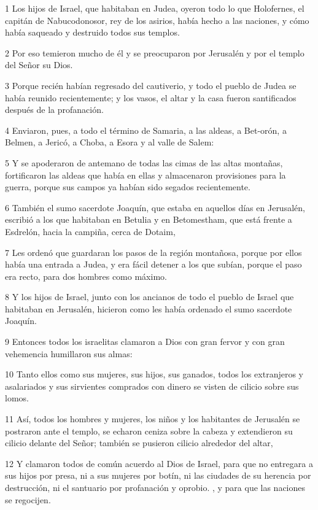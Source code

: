 \par 1 Los hijos de Israel, que habitaban en Judea, oyeron todo lo que Holofernes, el capitán de Nabucodonosor, rey de los asirios, había hecho a las naciones, y cómo había saqueado y destruido todos sus templos.
\par 2 Por eso temieron mucho de él y se preocuparon por Jerusalén y por el templo del Señor su Dios.
\par 3 Porque recién habían regresado del cautiverio, y todo el pueblo de Judea se había reunido recientemente; y los vasos, el altar y la casa fueron santificados después de la profanación.
\par 4 Enviaron, pues, a todo el término de Samaria, a las aldeas, a Bet-orón, a Belmen, a Jericó, a Choba, a Esora y al valle de Salem:
\par 5 Y se apoderaron de antemano de todas las cimas de las altas montañas, fortificaron las aldeas que había en ellas y almacenaron provisiones para la guerra, porque sus campos ya habían sido segados recientemente.
\par 6 También el sumo sacerdote Joaquín, que estaba en aquellos días en Jerusalén, escribió a los que habitaban en Betulia y en Betomestham, que está frente a Esdrelón, hacia la campiña, cerca de Dotaim,
\par 7 Les ordenó que guardaran los pasos de la región montañosa, porque por ellos había una entrada a Judea, y era fácil detener a los que subían, porque el paso era recto, para dos hombres como máximo.
\par 8 Y los hijos de Israel, junto con los ancianos de todo el pueblo de Israel que habitaban en Jerusalén, hicieron como les había ordenado el sumo sacerdote Joaquín.
\par 9 Entonces todos los israelitas clamaron a Dios con gran fervor y con gran vehemencia humillaron sus almas:
\par 10 Tanto ellos como sus mujeres, sus hijos, sus ganados, todos los extranjeros y asalariados y sus sirvientes comprados con dinero se visten de cilicio sobre sus lomos.
\par 11 Así, todos los hombres y mujeres, los niños y los habitantes de Jerusalén se postraron ante el templo, se echaron ceniza sobre la cabeza y extendieron su cilicio delante del Señor; también se pusieron cilicio alrededor del altar,
\par 12 Y clamaron todos de común acuerdo al Dios de Israel, para que no entregara a sus hijos por presa, ni a sus mujeres por botín, ni las ciudades de su herencia por destrucción, ni el santuario por profanación y oprobio. , y para que las naciones se regocijen.
